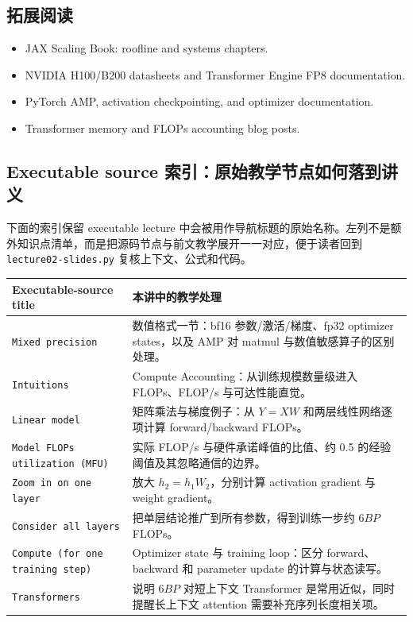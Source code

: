 \documentclass[a4paper]{article}
\begin{document}
\subsection{拓展阅读}

\begin{itemize}
    \item JAX Scaling Book: roofline and systems chapters.
    \item NVIDIA H100/B200 datasheets and Transformer Engine FP8 documentation.
    \item PyTorch AMP, activation checkpointing, and optimizer documentation.
    \item Transformer memory and FLOPs accounting blog posts.
\end{itemize}

\subsection{Executable source 索引：原始教学节点如何落到讲义}

下面的索引保留 executable lecture 中会被用作导航标题的原始名称。左列不是额外知识点清单，而是把源码节点与前文教学展开一一对应，便于读者回到 \texttt{lecture02-slides.py} 复核上下文、公式和代码。

\begin{longtable}{p{}p{}}
\toprule
\textbf{Executable-source title} & \textbf{本讲中的教学处理} \\
\midrule
\texttt{Mixed precision} & 数值格式一节：bf16 参数/激活/梯度、fp32 optimizer states，以及 AMP 对 matmul 与数值敏感算子的区别处理。 \\
\texttt{Intuitions} & Compute Accounting：从训练规模数量级进入 FLOPs、FLOP/s 与可达性能直觉。 \\
\texttt{Linear model} & 矩阵乘法与梯度例子：从 \(Y=XW\) 和两层线性网络逐项计算 forward/backward FLOPs。 \\
\texttt{Model FLOPs utilization (MFU)} & 实际 FLOP/s 与硬件承诺峰值的比值、约 0.5 的经验阈值及其忽略通信的边界。 \\
\texttt{Zoom in on one layer} & 放大 \(h_2=h_1W_2\)，分别计算 activation gradient 与 weight gradient。 \\
\texttt{Consider all layers} & 把单层结论推广到所有参数，得到训练一步约 \(6BP\) FLOPs。 \\
\texttt{Compute (for one training step)} & Optimizer state 与 training loop：区分 forward、backward 和 parameter update 的计算与状态读写。 \\
\texttt{Transformers} & 说明 \(6BP\) 对短上下文 Transformer 是常用近似，同时提醒长上下文 attention 需要补充序列长度相关项。 \\
\bottomrule
\end{longtable}
\end{document}
